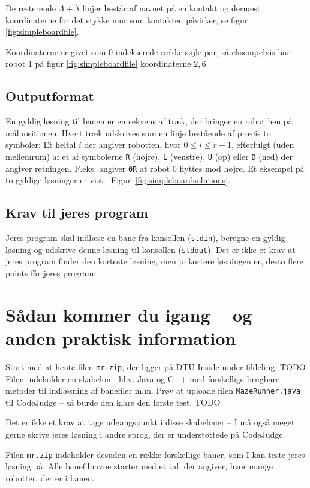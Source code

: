 \documentclass[10pt, a4paper]{article}
\begin{document}
De resterende $\Lambda+\lambda$ linjer består af navnet på en kontakt og dernæst koordinaterne for det stykke mur som kontakten påvirker, se figur \ref{fig:simpleboardfile}.

Koordinaterne er givet som 0-indekserede række-søjle par, så eksempelvis har robot 1 på figur \ref{fig:simpleboardfile} koordinaterne $2, 6$.

\subsection{Outputformat}
En gyldig løsning til banen er en sekvens af træk, der bringer en robot hen på målpositionen.
Hvert træk udskrives som en linje bestående af præcis to symboler: Et heltal $i$ der angiver robotten, hvor $0 \leq i \leq r-1$, efterfulgt (uden mellemrum) af et af symbolerne \texttt{R} (højre), \texttt{L} (venstre), \texttt{U} (op) eller \texttt{D} (ned) der angiver retningen.
F.eks. angiver \texttt{0R} at robot 0 flyttes mod højre. Et eksempel på to gyldige løsninger er vist i Figur~\ref{fig:simpleboardsolutions}.

\subsection{Krav til jeres program}
Jeres program skal indlæse en bane fra konsollen (\texttt{stdin}), beregne en gyldig løsning og udskrive denne løsning til konsollen (\texttt{stdout}).
Det er ikke et krav at jeres program finder den korteste løsning, men jo kortere løsningen er, desto flere points får jeres program.

\section{Sådan kommer du igang -- og anden praktisk information}
Start med at hente filen \texttt{mr.zip}, der ligger på DTU Inside under fildeling. TODO
Filen indeholder en skabelon i hhv. Java og C++ med forskellige brugbare metoder til indlæsning af banefiler m.m.
Prøv at uploade filen \texttt{MazeRunner.java} til CodeJudge -- så burde den klare den første test. TODO

Det er ikke et krav at tage udgangspunkt i disse skabeloner -- I må også meget gerne skrive jeres løsning i andre sprog, der er understøttede på CodeJudge.

Filen \texttt{mr.zip} indeholder desuden en række forskellige baner, som I kan teste jeres løsning på.
Alle banefilnavne starter med et tal, der angiver, hvor mange robotter, der er i banen.
\end{document}
